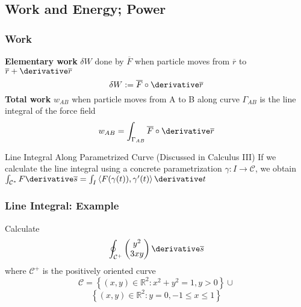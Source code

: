 \subsection{Work and Energy; Power}
\begin{frame}
\frametitle{Work}
\begin{definition}
\alert{\textbf{Elementary work}} $\delta W$ done by $\overline{F}$ when particle moves from $\overline{r}$ to $\overline{r}+\derivative\overline{r}$
\[\delta W:=\overline{F}\circ\derivative\overline{r}\]
\alert{\textbf{Total work}} $w_{AB}$ when particle moves from A to B along curve $\Gamma_{AB}$ is the \alert{line integral} of the \alert{force field}
\[w_{AB}=\int_{\Gamma_{AB}}\overline{F}\circ\derivative\overline{r}\]
\end{definition}
\begin{block}{Line Integral Along Parametrized Curve (Discussed in Calculus III)}
If we calculate the line integral using a concrete parametrization $\gamma: I\to\mathcal{C}$, we obtain $\int_{\mathcal{C}^{*}}F\derivative\overline{s}=\int_{I}\left<F(\gamma(t)),\gamma'(t)\right>\derivative t$
\end{block}
\end{frame}
\begin{frame}
\frametitle{Line Integral: Example}
\begin{example}
Calculate \[\oint_{\mathcal{C}^{+}}\left(\begin{matrix}y^{2}\\3xy\end{matrix}\right)\derivative \overline{s}\] where $\mathcal{C}^{+}$ is the positively oriented curve
\[\mathcal{C}=\left\{(x,y)\in\mathbb{R}^{2}:x^2+y^2=1,y>0\right\}\cup\]\[\left\{(x,y)\in\mathbb{R}^{2}:y=0,-1\leq x\leq 1\right\}\]
\end{example}
\end{frame}
